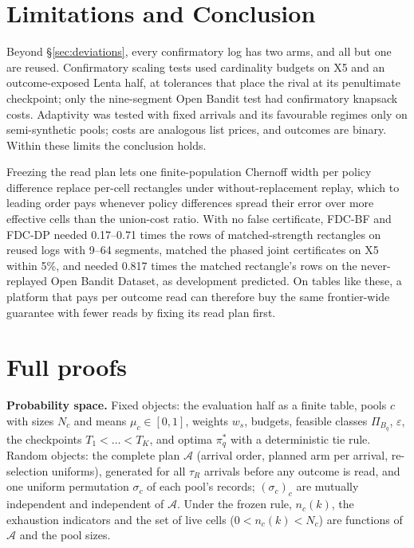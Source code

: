 \documentclass[sigconf,anonymous,review]{acmart}
\newcommand{\cA}{\mathcal{A}}
\newcommand{\eps}{\varepsilon}
\begin{document}
\section{Limitations and Conclusion}\label{sec:conclusion}

Beyond \S\ref{sec:deviations}, every confirmatory log has two arms, and all but one are reused. Confirmatory scaling tests used cardinality budgets on X5 and an outcome-exposed Lenta half, at tolerances that place the rival at its penultimate checkpoint; only the nine-segment Open Bandit test had confirmatory knapsack costs. Adaptivity was tested with fixed arrivals and its favourable regimes only on semi-synthetic pools; costs are analogous list prices, and outcomes are binary. Within these limits the conclusion holds.

Freezing the read plan lets one finite-population Chernoff width per policy difference replace per-cell rectangles under without-replacement replay, which to leading order pays whenever policy differences spread their error over more effective cells than the union-cost ratio. With no false certificate, FDC-BF and FDC-DP needed 0.17--0.71 times the rows of matched-strength rectangles on reused logs with 9--64 segments, matched the phased joint certificates on X5 within 5\%, and needed 0.817 times the matched rectangle's rows on the never-replayed Open Bandit Dataset, as development predicted. On tables like these, a platform that pays per outcome read can therefore buy the same frontier-wide guarantee with fewer reads by fixing its read plan first.




\appendix
\setcounter{table}{0}
\renewcommand{\thetable}{A\arabic{table}}
\setcounter{figure}{0}
\renewcommand{\thefigure}{A\arabic{figure}}

\section{Full proofs}\label{app:proofs}

\textbf{Probability space.} Fixed objects: the evaluation half as a finite table, pools $c$ with sizes $N_c$ and means $\mu_c \in [0,1]$, weights $w_s$, budgets, feasible classes $\Pi_{B_q}$, $\eps$, the checkpoints $T_1 < \dots < T_K$, and optima $\pi^*_q$ with a deterministic tie rule. Random objects: the complete plan $\cA$ (arrival order, planned arm per arrival, re-selection uniforms), generated for all $\tau_R$ arrivals before any outcome is read, and one uniform permutation $\sigma_c$ of each pool's records; $(\sigma_c)_c$ are mutually independent and independent of $\cA$. Under the frozen rule, $n_c(k)$, the exhaustion indicators and the set of live cells ($0 < n_c(k) < N_c$) are functions of $\cA$ and the pool sizes.
\end{document}
